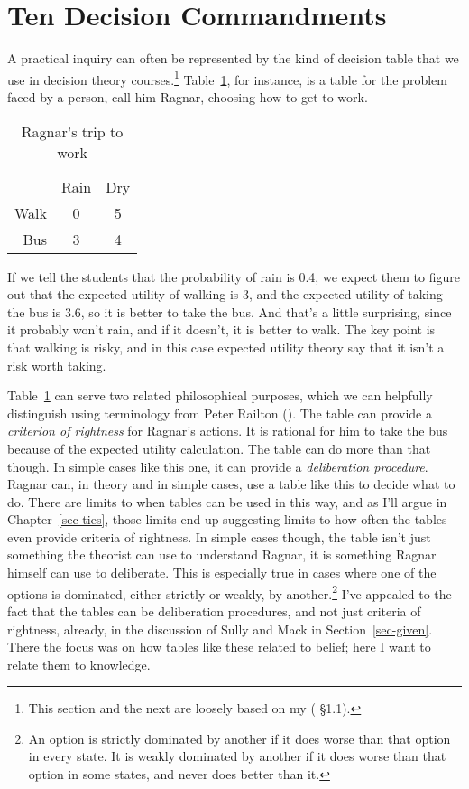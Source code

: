 \documentclass[
  10pt,
  letterpaper,
  twoside]{scrbook}
\begin{document}
\section{Ten Decision Commandments}\label{sec-makdec}

A practical inquiry can often be represented by the kind of decision
table that we use in decision theory courses.\footnote{This section and
  the next are loosely based on my (
  §1.1).} Table~\ref{tbl-walkbus}, for instance, is a table for the
problem faced by a person, call him Ragnar, choosing how to get to work.

\begin{longtable}[]{@{}rcc@{}}
\caption{Ragnar's trip to work}\label{tbl-walkbus}\tabularnewline
\toprule\noalign{}
\endfirsthead
\endhead
\bottomrule\noalign{}
\endlastfoot
~ & Rain & Dry \\
Walk & 0 & 5 \\
Bus & 3 & 4 \\
\end{longtable}

If we tell the students that the probability of rain is 0.4, we expect
them to figure out that the expected utility of walking is 3, and the
expected utility of taking the bus is 3.6, so it is better to take the
bus. And that's a little surprising, since it probably won't rain, and
if it doesn't, it is better to walk. The key point is that walking is
risky, and in this case expected utility theory say that it isn't a risk
worth taking.

Table~\ref{tbl-walkbus} can serve two related philosophical purposes,
which we can helpfully distinguish using terminology from Peter Railton
(). The table can provide a
\emph{criterion of rightness} for Ragnar's actions. It is rational for
him to take the bus because of the expected utility calculation. The
table can do more than that though. In simple cases like this one, it
can provide a \emph{deliberation procedure}. Ragnar can, in theory and
in simple cases, use a table like this to decide what to do. There are
limits to when tables can be used in this way, and as I'll argue in
Chapter~\ref{sec-ties}, those limits end up suggesting limits to how
often the tables even provide criteria of rightness. In simple cases
though, the table isn't just something the theorist can use to
understand Ragnar, it is something Ragnar himself can use to deliberate.
This is especially true in cases where one of the options is dominated,
either strictly or weakly, by another.\footnote{An option is strictly
  dominated by another if it does worse than that option in every state.
  It is weakly dominated by another if it does worse than that option in
  some states, and never does better than it.} I've appealed to the fact
that the tables can be deliberation procedures, and not just criteria of
rightness, already, in the discussion of Sully and Mack in
Section~\ref{sec-given}. There the focus was on how tables like these
related to belief; here I want to relate them to knowledge.
\end{document}
